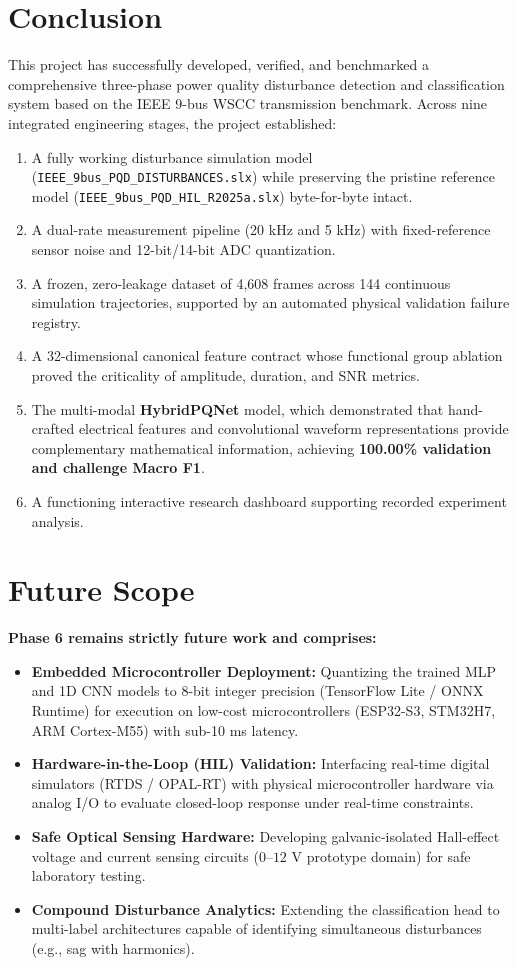 \documentclass[12pt,a4paper]{report}
\begin{document}
\section{Conclusion}
This project has successfully developed, verified, and benchmarked a comprehensive three-phase power quality disturbance detection and classification system based on the IEEE 9-bus WSCC transmission benchmark. Across nine integrated engineering stages, the project established:
\begin{enumerate}
    \item A fully working disturbance simulation model (\texttt{IEEE\_9bus\_PQD\_DISTURBANCES.slx}) while preserving the pristine reference model (\texttt{IEEE\_9bus\_PQD\_HIL\_R2025a.slx}) byte-for-byte intact.
    \item A dual-rate measurement pipeline (20 kHz and 5 kHz) with fixed-reference sensor noise and 12-bit/14-bit ADC quantization.
    \item A frozen, zero-leakage dataset of 4,608 frames across 144 continuous simulation trajectories, supported by an automated physical validation failure registry.
    \item A 32-dimensional canonical feature contract whose functional group ablation proved the criticality of amplitude, duration, and SNR metrics.
    \item The multi-modal \textbf{HybridPQNet} model, which demonstrated that hand-crafted electrical features and convolutional waveform representations provide complementary mathematical information, achieving \textbf{100.00\% validation and challenge Macro F1}.
    \item A functioning interactive research dashboard supporting recorded experiment analysis.
\end{enumerate}

\section{Future Scope}
\textbf{Phase 6 remains strictly future work and comprises:}
\begin{itemize}
    \item \textbf{Embedded Microcontroller Deployment:} Quantizing the trained MLP and 1D CNN models to 8-bit integer precision (TensorFlow Lite / ONNX Runtime) for execution on low-cost microcontrollers (ESP32-S3, STM32H7, ARM Cortex-M55) with sub-10 ms latency.
    \item \textbf{Hardware-in-the-Loop (HIL) Validation:} Interfacing real-time digital simulators (RTDS / OPAL-RT) with physical microcontroller hardware via analog I/O to evaluate closed-loop response under real-time constraints.
    \item \textbf{Safe Optical Sensing Hardware:} Developing galvanic-isolated Hall-effect voltage and current sensing circuits ($0\text{--}12\text{ V}$ prototype domain) for safe laboratory testing.
    \item \textbf{Compound Disturbance Analytics:} Extending the classification head to multi-label architectures capable of identifying simultaneous disturbances (e.g., sag with harmonics).
\end{itemize}
\end{document}
